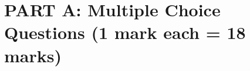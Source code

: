 \documentclass{article}
\begin{document}
\section*{\centering\large PART A: Multiple Choice Questions (1 mark each = 18 marks)}


\end{document}
